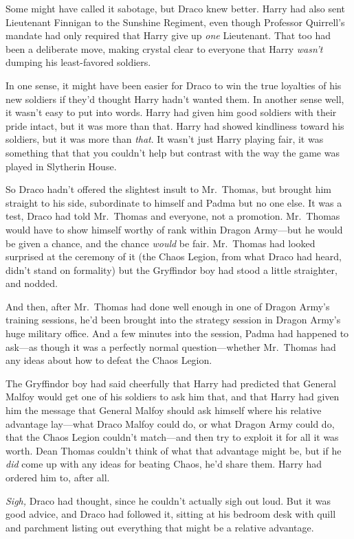 Some might have called it sabotage, but Draco knew better. Harry had also sent
Lieutenant Finnigan to the Sunshine Regiment, even though Professor Quirrell's
mandate had only required that Harry give up \emph{one} Lieutenant. That too
had been a deliberate move, making crystal clear to everyone that Harry
\emph{wasn't} dumping his least-favored soldiers.

In one sense, it might have been easier for Draco to win the true loyalties of
his new soldiers if they'd thought Harry hadn't wanted them. In another
sense{\el} well, it wasn't easy to put into words. Harry had given him good
soldiers with their pride intact, but it was more than that. Harry had showed
kindliness toward his soldiers, but it was more than \emph{that}. It wasn't
just Harry playing fair, it was something that{\el} that you couldn't help
but contrast with the way the game was played in Slytherin House.

So Draco hadn't offered the slightest insult to Mr.~Thomas, but brought him
straight to his side, subordinate to himself and Padma but no one else. It was
a test, Draco had told Mr.~Thomas and everyone, not a promotion. Mr.~Thomas
would have to show himself worthy of rank within Dragon Army—but he would be
given a chance, and the chance \emph{would} be fair. Mr.~Thomas had looked
surprised at the ceremony of it (the Chaos Legion, from what Draco had heard,
didn't stand on formality) but the Gryffindor boy had stood a little
straighter, and nodded.

And then, after Mr.~Thomas had done well enough in one of Dragon Army's
training sessions, he'd been brought into the strategy session in Dragon Army's
huge military office. And a few minutes into the session, Padma had happened to
ask—as though it was a perfectly normal question—whether Mr.~Thomas had any
ideas about how to defeat the Chaos Legion.

The Gryffindor boy had said cheerfully that Harry had predicted that General
Malfoy would get one of his soldiers to ask him that, and that Harry had given
him the message that General Malfoy should ask himself where his relative
advantage lay—what Draco Malfoy could do, or what Dragon Army could do, that
the Chaos Legion couldn't match—and then try to exploit it for all it was
worth. Dean Thomas couldn't think of what that advantage might be, but if he
\emph{did} come up with any ideas for beating Chaos, he'd share them. Harry had
ordered him to, after all.

\emph{Sigh,} Draco had thought, since he couldn't actually sigh out loud. But
it was good advice, and Draco had followed it, sitting at his bedroom desk with
quill and parchment listing out everything that might be a relative advantage.

